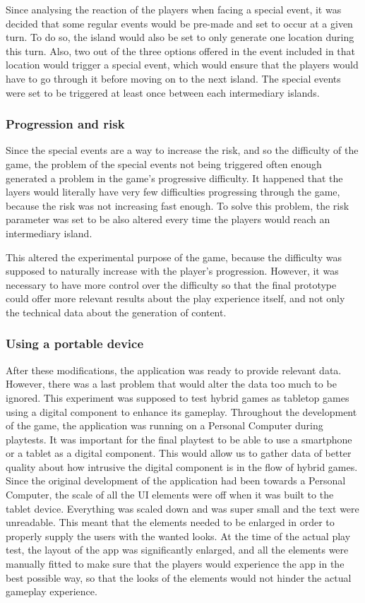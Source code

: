 Since analysing the reaction of the players when facing a special event, it was decided that some regular events would be pre-made and set to occur at a given turn. To do so, the island would also be set to only generate one location during this turn. Also, two out of the three options offered in the event included in that location would trigger a special event, which would ensure that the players would have to go through it before moving on to the next island. The special events were set to be triggered at least once between each intermediary islands.
\subsubsection{Progression and risk}
Since the special events are a way to increase the risk, and so the difficulty of the game, the problem of the special events not being triggered often enough generated a problem in the game's progressive difficulty. It happened that the layers would literally have very few difficulties progressing through the game, because the risk was not increasing fast enough. To solve this problem, the risk parameter was set to be also altered every time the players would reach an intermediary island.

This altered the experimental purpose of the game, because the difficulty was supposed to naturally increase with the player's progression. However, it was necessary to have more control over the difficulty so that the final prototype could offer more relevant results about the play experience itself, and not only the technical data about the generation of content.

\subsubsection{Using a portable device}
After these modifications, the application was ready to provide relevant data. However, there was a last problem that would alter the data too much to be ignored. This experiment was supposed to test hybrid games as tabletop games using a digital component to enhance its gameplay. Throughout the development of the game, the application was running on a Personal Computer during playtests. It was important for the final playtest to be able to use a smartphone or a tablet as a digital component. This would allow us to gather data of better quality about how intrusive the digital component is in the flow of hybrid games.  
Since the original development of the application had been towards a Personal Computer, the scale of all the UI elements were off when it was built to the tablet device. Everything was scaled down and was super small and the text were unreadable. This meant that the elements needed to be enlarged in order to properly supply the users with the wanted looks. At the time of the actual play test, the layout of the app was significantly enlarged, and all the elements were manually fitted to make sure that the players would experience the app in the best possible way, so that the looks of the elements would not hinder the actual gameplay experience.

